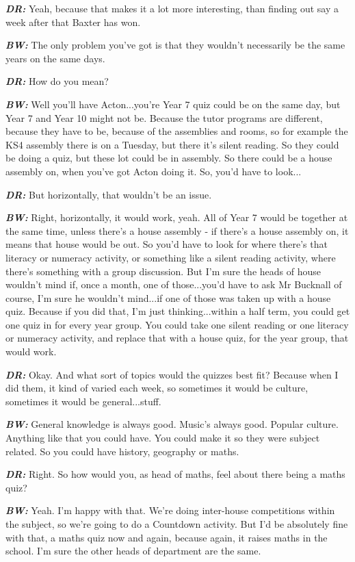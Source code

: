 \textit{\textbf{DR:}} Yeah, because that makes it a lot more interesting, than finding out say a week after that Baxter has won.

\textit{\textbf{BW:}} The only problem you've got is that they wouldn't necessarily be the same years on the same days.

\textit{\textbf{DR:}} How do you mean?

\textit{\textbf{BW:}} Well you'll have Acton...you're Year 7 quiz could be on the same day, but Year 7 and Year 10 might not be. Because the tutor programs are different, because they have to be, because of the assemblies and rooms, so for example the KS4 assembly there is on a Tuesday, but there it's silent reading. So they could be doing a quiz, but these lot could be in assembly. So there could be a house assembly on, when you've got Acton doing it. So, you'd have to look...

\textit{\textbf{DR:}} But horizontally, that wouldn't be an issue.

\textit{\textbf{BW:}} Right, horizontally, it would work, yeah. All of Year 7 would be together at the same time, unless there's a house assembly - if there's a house assembly on, it means that house would be out. So you'd have to look for where there's that literacy or numeracy activity, or something like a silent reading activity, where there's something with a group discussion. But I'm sure the heads of house wouldn't mind if, once a month, one of those...you'd have to ask Mr Bucknall of course, I'm sure he wouldn't mind...if one of those was taken up with a house quiz. Because if you did that, I'm just thinking...within a half term, you could get one quiz in for every year group. You could take one silent reading or one literacy or numeracy activity, and replace that with a house quiz, for the year group, that would work.

\textit{\textbf{DR:}} Okay. And what sort of topics would the quizzes best fit? Because when I did them, it kind of varied each week, so sometimes it would be culture, sometimes it would be general...stuff.

\textit{\textbf{BW:}} General knowledge is always good. Music's always good. Popular culture. Anything like that you could have. You could make it so they were subject related. So you could have history, geography or maths.

\textit{\textbf{DR:}} Right. So how would you, as head of maths, feel about there being a maths quiz?

\textit{\textbf{BW:}} Yeah. I'm happy with that. We're doing inter-house competitions within the subject, so we're going to do a Countdown activity. But I'd be absolutely fine with that, a maths quiz now and again, because again, it raises maths in the school. I'm sure the other heads of department are the same.

